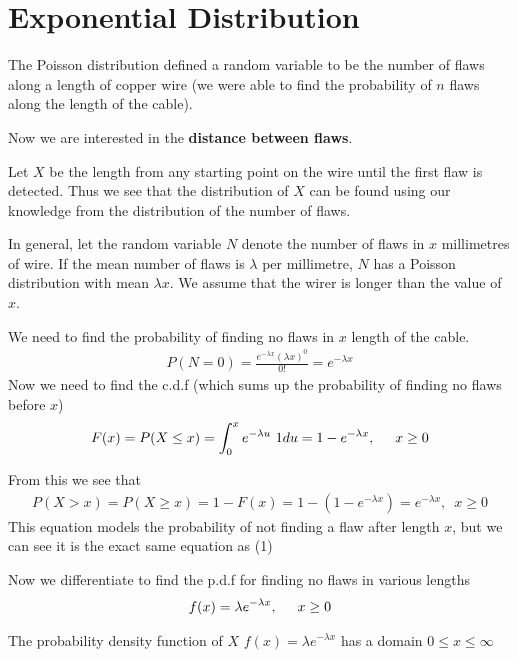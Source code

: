 \documentclass[12pt, titlepage, oneside]{article}
\renewcommand{\b}[1]{\textbf{#1}}
\begin{document}
	\section{Exponential Distribution}
	
The Poisson distribution defined a random variable to be the number of flaws along a length of copper wire (we were able to find the probability of $n$ flaws along the length of the cable).

Now we are interested in the \b{distance between flaws}. 

Let $X$ be the length from any starting point on the wire until the first flaw is detected. Thus we see that the distribution of $X$ can be found using our knowledge from the distribution of the number of flaws. 

In general, let the random variable $N$ denote the number of flaws in $x$ millimetres of wire. If the mean number of flaws is $\lambda$ per millimetre, $N$ has a Poisson distribution with mean $\lambda x$. We assume that the wirer is longer than the value of $x$. 

We need to find the probability of finding no flaws in $x$ length of the cable.
\begin{align}
	P(N = 0) = \frac{e^{-\lambda x} (\lambda x )^0}{0!} = e^{-\lambda x}
\end{align}
Now we need to find the c.d.f (which sums up the probability of finding no flaws before $x$)
\begin{align}
F(x) = P(X \leq x) = \int_0^x e^{-\lambda u} \,\,1du =  1 - e^{-\lambda x} ,\hspace{5mm}  x \geq 0
\end{align}

From this we see that
\begin{align}
P(X > x) = P(X \geq x ) = 1 - F(x) = 1 - ( 1 - e^{-\lambda x}) = e^{-\lambda x}, \enspace x \geq 0
\end{align}
This equation models the probability of not finding a flaw after length $x$, but we can see it is the exact same equation as (1)


Now we differentiate to find the p.d.f for finding no flaws in various lengths
\begin{align}
f(x) = \lambda e^{-\lambda x}, \hspace{5mm} x \geq 0
\end{align}

The probability density function of $X$ $f(x) = \lambda e^{-\lambda x} $ has a domain $0 \leq x  \leq \infty$
	
\end{document}
